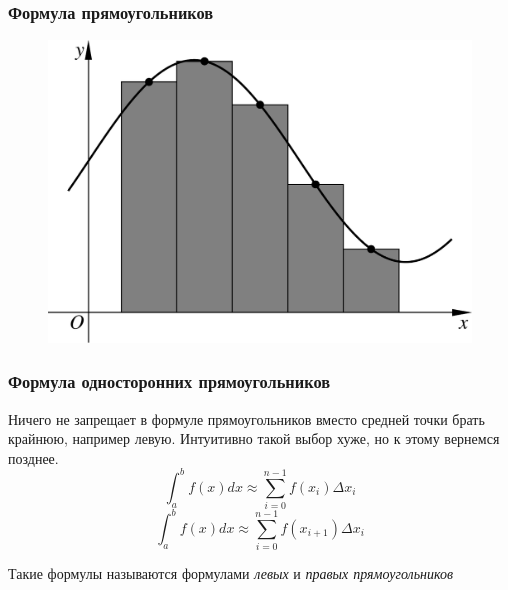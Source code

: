 \documentclass[aspectratio=169,unicode]{beamer}
\begin{document}
\begin{frame}
\frametitle{Формула прямоугольников}
	\begin{figure}%
	\includegraphics[height=.8\textheight]{rect.pdf}%
	\end{figure}
\end{frame}

\begin{frame}
\frametitle{Формула односторонних прямоугольников}
	Ничего не запрещает в формуле прямоугольников вместо средней точки брать крайнюю, например левую.
	Интуитивно такой выбор хуже, но к этому вернемся позднее.
	\[
	\int_a^b f(x) dx \approx \sum_{i=0}^{n-1} f\left(x_i\right)\Delta x_i
	\]
	\[
	\int_a^b f(x) dx \approx \sum_{i=0}^{n-1} f\left(x_{i+1}\right)\Delta x_i
	\]

	\pause

	Такие формулы называются формулами \emph{левых} и \emph{правых прямоугольников}
\end{frame}
\end{document}
